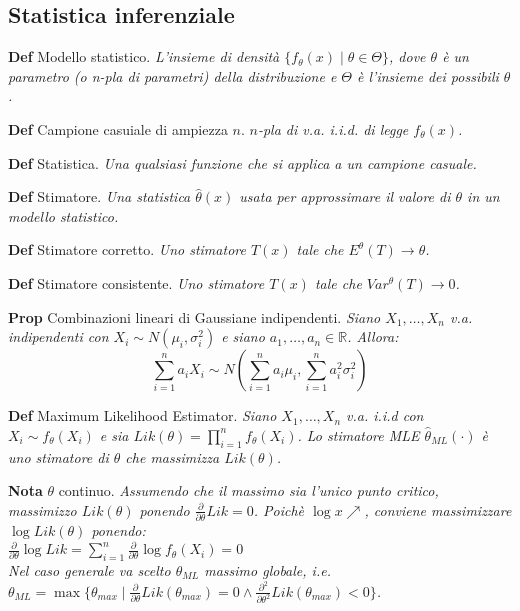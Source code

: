 \documentclass[a4paper,9pt]{article}
\begin{document}
\begin{multicols*}{3}
\subsection*{Statistica inferenziale}

\textbf{Def} Modello statistico. \textit{
    L'insieme di densità $\{f_\theta(x) \mid \theta \in \Theta\}$, dove $\theta$ è un parametro (o n-pla di parametri) della distribuzione e $\Theta$ è l'insieme dei possibili $\theta$.
}

\bigskip

\textbf{Def} Campione casuiale di ampiezza $n$. \textit{$n$-pla di v.a. i.i.d. di legge $f_\theta(x)$.}

\bigskip
\textbf{Def} Statistica. \textit{Una qualsiasi funzione che si applica a un campione casuale.}

\bigskip
\textbf{Def} Stimatore. \textit{Una statistica $\hat{\theta}(x)$ usata per approssimare il valore di $\theta$ in un modello statistico.}

\bigskip
\textbf{Def} Stimatore corretto. \textit{Uno stimatore $T(x)$ tale che $E^\theta(T) \to \theta$.}

\bigskip
\textbf{Def} Stimatore consistente. \textit{Uno stimatore $T(x)$ tale che $Var^\theta(T) \to 0$.}

\bigskip
\textbf{Prop} Combinazioni lineari di Gaussiane indipendenti. \textit{
Siano $X_1, \dots, X_n$ v.a. indipendenti con $X_i \sim N(\mu_i,\sigma_i^2)$ e siano $a_1, \dots, a_n
\in \mathbb{R}$. Allora:
$$\sum\limits_{i=1}^n a_iX_i \sim N\left( \sum\limits_{i=1}^n a_i\mu_i, \sum\limits_{i=1}^n a_i^2\sigma_i^2 \right)$$
}

\bigskip

\textbf{Def} Maximum Likelihood Estimator. \textit{
Siano $X_1, \dots, X_n$ v.a. i.i.d con $X_i \sim f_\theta(X_i)$ e sia $Lik(\theta) = \prod\limits_{i=1}^n f_\theta(X_i)$. Lo stimatore MLE $\hat{\theta}_{ML}(\cdot)$ è uno stimatore di $\theta$ che massimizza $Lik(\theta)$.
}

\bigskip

\textbf{Nota} $\theta$ continuo. \textit{
Assumendo che il massimo sia l'unico punto critico, massimizzo $Lik(\theta)$ ponendo $\frac{\partial}{\partial \theta} Lik = 0$. Poichè $\log x \nearrow$, conviene massimizzare $\log Lik(\theta)$ ponendo: \\ $\frac{\partial}{\partial \theta} \log Lik = \sum\limits_{i=1}^n \frac{\partial}{\partial \theta} \log f_\theta(X_i) = 0$ \\ Nel caso generale va scelto $\theta_{ML}$ massimo globale, i.e. $\theta_{ML} = \max \{ \theta_{max} \mid \frac{\partial}{\partial \theta} Lik(\theta_{max}) = 0 \land \frac{\partial^2}{\partial \theta^2} Lik(\theta_{max}) < 0 \}$.
}


\end{multicols*}
\end{document}
